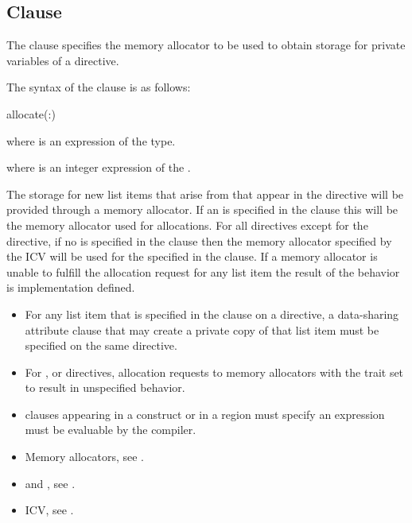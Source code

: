\subsection{ Clause}
\label{subsec:allocate Clause}
\summary
The  clause specifies the memory allocator to be used to obtain storage for private variables of a directive.

\syntax

The syntax of the  clause is as follows:

\begin{ompSyntax}
allocate(\plc{[allocator}:\plc{] list})
\end{ompSyntax}

\begin{ccppspecific}
where  is an expression of the  type.
\end{ccppspecific}
\begin{fortranspecific}
where  is an integer expression of the  .
\end{fortranspecific}

\descr

The storage for new list items that arise from  that appear in the directive will be provided through a memory allocator. If an  is specified in the clause this will be the memory allocator used for allocations. For all directives except for the  directive, if no  is specified in the clause then the memory allocator specified by the  ICV will be used for the  specified in the  clause. If a memory allocator is unable to fulfill the allocation request for any list item the result of the behavior is implementation defined.

\restrictions
\begin{itemize}
\item For any list item that is specified in the  clause on a directive, a data-sharing attribute clause that may create a private copy of that list item must be specified on the same directive.
\item For ,  or  directives, allocation requests to memory allocators with the trait  set to  result in unspecified behavior.
\item {} clauses appearing in a  construct or in a  region must specify an  expression must be evaluable by the compiler.
\end{itemize}

\crossreferences
\begin{itemize}
\item Memory allocators, see .
\item {} and , see .
\item {} ICV, see .
\end{itemize}
